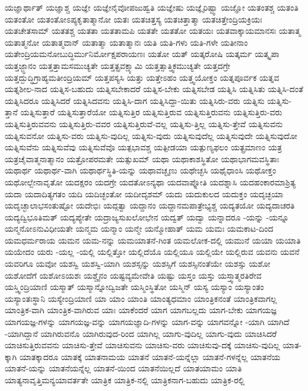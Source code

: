 {ಯಜ್ಞಾರ್ಥಾತ್
ಯಜ್ಞಾಶ್ಚ
ಯಜ್ಞೇ
ಯಜ್ಞೇನೈವೋಪಜುಹ್ವತಿ
ಯಜ್ಞೇಷು
ಯಜ್ಞೈರಿಷ್ಟ್ವಾ
ಯಜ್ಞೋ
ಯತಂತಶ್ಚ
ಯತಂತಿ
ಯತಂತೋ
ಯತಂತೋಽಪ್ಯಕೃತಾತ್ಮಾನೋ
ಯತಃ
ಯತಚಿತ್ತಸ್ಯ
ಯತಚಿತ್ತಾತ್ಮಾ
ಯತಚಿತ್ತೇಂದ್ರಿಯಕ್ರಿಯಃ
ಯತಚೇತಸಾಮ್
ಯತತಶ್ಚ
ಯತತಾ
ಯತತಾಮಪಿ
ಯತತೇ
ಯತತೋ
ಯತಯಃ
ಯತವಾಕ್ಕಾಯಮಾನಸಃ
ಯತಾತ್ಮ
ಯತಾತ್ಮನೋ
ಯತಾತ್ಮವಾನ್
ಯತಾತ್ಮಾ
ಯತಾತ್ಮಾನಃ
ಯತಿ
ಯತಿ-ಗಳು
ಯತಿ-ಗಳೇ
ಯತೀನಾಂ
ಯತೇಂದ್ರಿಯಮನೋಬುದ್ಧಿರ್ಮುನಿರ್ಮೋಕ್ಷಪರಾಯಣಃ
ಯತೋ
ಯತ್
ಯತ್ಕರೋಷಿ
ಯತ್ಕರ್ಮ
ಯತ್ಕೃಪಾ
ಯತ್ತಜ್ಜ್ಞಾನಂ
ಯತ್ತತ್ತಾಮಸಮುಚ್ಯತೇ
ಯತ್ತತ್ಪ್ರವಕ್ಷ್ಯಾಮಿ
ಯತ್ತತ್ಸಾತ್ತ್ವಿಕಮುಚ್ಯತೇ
ಯತ್ತದಗ್ರೇ
ಯತ್ತದ್ಬುದ್ಧಿಗ್ರಾಹ್ಯಮತೀಂದ್ರಿಯಮ್
ಯತ್ತಪಸ್ಯಸಿ
ಯತ್ತು
ಯತ್ತೇಽಹಂ
ಯತ್ತ್ವಯೋಕ್ತಂ
ಯತ್ನಪೂರ್ವಕ
ಯತ್ನವ
ಯತ್ನಶೀಲ-ನಾದ
ಯತ್ನಿಸ-ಬಹುದು
ಯತ್ನಿಸಬೇಕಾದರೆ
ಯತ್ನಿಸ-ಬೇಕು
ಯತ್ನಿಸಬೇಡ
ಯತ್ನಿಸಿ
ಯತ್ನಿಸಿತು
ಯತ್ನಿಸಿ-ದಂತೆ
ಯತ್ನಿಸಿದರೂ
ಯತ್ನಿಸಿದರೆ
ಯತ್ನಿಸಿದವನು
ಯತ್ನಿಸಿ-ದಾಗ
ಯತ್ನಿಸಿದ್ದಾ-ಯಿತು
ಯತ್ನಿಸಿರು-ವರು
ಯತ್ನಿಸು
ಯತ್ನಿಸು-ತ್ತಾನೆ
ಯತ್ನಿಸುತ್ತಾರೆ
ಯತ್ನಿಸುತ್ತಾರೆಯೋ
ಯತ್ನಿಸುತ್ತಿರ
ಯತ್ನಿಸುತ್ತಿರುವ
ಯತ್ನಿಸುತ್ತಿರುವನು
ಯತ್ನಿಸುತ್ತಿರು-ವರು
ಯತ್ನಿಸುತ್ತಿರುವವನು
ಯತ್ನಿಸುತ್ತಿರು-ವವರ
ಯತ್ನಿಸುತ್ತಿರುವೆ-ವಲ್ಲ
ಯತ್ನಿಸು-ತ್ತಿಲ್ಲ
ಯತ್ನಿಸು-ತ್ತೇವೆ
ಯತ್ನಿಸುವನು
ಯತ್ನಿಸುವನೋ
ಯತ್ನಿಸು-ವರು
ಯತ್ನಿಸು-ವುದಿಲ್ಲ
ಯತ್ನಿಸು-ವುದು
ಯತ್ನಿಸುವುದೆಲ್ಲ
ಯತ್ನಿಸುವುದೇ
ಯತ್ನಿಸುವುದೋ
ಯತ್ನಿಸುವೆನು
ಯತ್ನಿಸುವೆವು
ಯತ್ನಿಸುವೆವೊ
ಯತ್ಪಭಾವಶ್ಚ
ಯತ್ಪೀಡಯಾ
ಯತ್ಪುಣ್ಯಫಲಂ
ಯತ್ಪ್ರಮಾಣಂ
ಯತ್ರ
ಯತ್ರಚೈವಾತ್ಮನಾತ್ಮಾನಂ
ಯತ್ರೋಪರಮತೇ
ಯತ್ಸುಖಮ್
ಯಥಾ
ಯಥಾಕಾಶಸ್ಥಿತೋ
ಯಥಾಭಾಗಮವಸ್ಥಿತಾಃ
ಯಥಾರ್ಥ
ಯಥಾರ್ಥ-ವಾಗಿ
ಯಥಾರ್ಥಸ್ಥಿತಿ-ಯನ್ನು
ಯಥಾವಚ್ಛೃಣು
ಯಥೇಚ್ಛಸಿ
ಯಥೈಧಾಂಸಿ
ಯಥೋಕ್ತಂ
ಯಥೋಲ್ಬೇನಾವೃತೋ
ಯದಕ್ಷರಂ
ಯದಗ್ರೇ
ಯದತೋಽನ್ಯಥಾ
ಯದವಾಪ್ನೋತಿ
ಯದಶ್ನಾಸಿ
ಯದಹಂಕಾರಮಾಶ್ರಿತ್ಯ
ಯದಾ
ಯದಾದಿತ್ಯಗತಂ
ಯದಿ
ಯದಿಚ್ಛಂತೋ
ಯದೀದೃಶಮ್
ಯದು
ಯದುಕುಲದ
ಯದುಕ್ತಂ
ಯದೃಚ್ಛಯಾ
ಯದೃಚ್ಛಾಲಾಭಸಂತುಷ್ಟೋ
ಯದೇಭಿಃ
ಯದ್ಗತ್ವಾ
ಯದ್ದಾನಂ
ಯದ್ದಾನಮಪಾತ್ರೇಭ್ಯಶ್ಚ
ಯದ್ಯತಯೋ
ಯದ್ಯದಾಚರತಿ
ಯದ್ಯದ್ವಿಭೂತಿಮತ್
ಯದ್ಯಪ್ಯೇತೇ
ಯದ್ರಾಜ್ಯಸುಖಲೋಭೇನ
ಯದ್ವತ್
ಯದ್ವಾ
ಯನ್ನಾದರೂ
-ಯನ್ನು
-ಯನ್ನೂ
ಯನ್ಮನೋಽನುವಿಧೀಯತೇ
ಯನ್ಮಮ
ಯನ್ಮಾಂ
ಯನ್ಮೇ
ಯನ್ಮೋಹಾತ್
ಯಮ
ಯಮಃ
ಯಮಕಾಟ-ದಿಂದ
ಯಮಧರ್ಮರಾಯ
ಯಮನ
ಯಮ-ನನ್ನು
ಯಮಯಾತನೆ-ಗಿಂತ
ಯಮಲೋಕ-ದಲ್ಲಿ
ಯಮುನೆ
ಯಯಾ
ಯಯಾತಿ
ಯಯೇದಂ
ಯರು
-ಯಲ್ಲ
-ಯಲ್ಲಿ
ಯಲ್ಲಿತ್ತೋ
ಯಲ್ಲಿದೆಯೊ
ಯಲ್ಲಿಯೂ
ಯಲ್ಲಿಯೇ
ಯಲ್ಲಿರುವ
ಯವನು
ಯವನೆ
ಯವರಿಗೂ
ಯವೋ
ಯಶಸ್ವಿ
ಯಶಸ್ವಿ-ಯಾಗಿ
ಯಶಸ್ಸನ್ನು
ಯಶಸ್ಸಿಗೆ
ಯಶಸ್ಸಿನಂತೆಯೇ
ಯಶಸ್ಸು
ಯಶೋ
ಯಶೋದೆಗೆ
ಯಶೋಽಯಶಃ
ಯಶ್ಚೈನಂ
ಯಷ್ಟವ್ಯಮೇವೇತಿ
ಯಷ್ಟು
ಯಸ್ತಂ
ಯಸ್ತು
ಯಸ್ತ್ವಾತ್ಮರತಿರೇವ
ಯಸ್ತ್ವಿಂದ್ರಿಯಾಣಿ
ಯಸ್ಮಾತ್
ಯಸ್ಮಾನ್ನೋದ್ವಿಜತೇ
ಯಸ್ಮಿಂಸ್ಥಿತೋ
ಯಸ್ಮಿನ್
ಯಸ್ಯ
ಯಸ್ಯಾಂ
ಯಸ್ಯಾಂತಂ
ಯಸ್ಯಾಂತಃಸ್ಥಾನಿ
ಯಸ್ಯೇಂದ್ರಿಯಾಣಿ
ಯಾ
ಯಾಂ
ಯಾಂತಿ
ಯಾಂತ್ಯಧಮಾಂ
ಯಾಂತ್ರಿಕನಂತೆ
ಯಾಂತ್ರಿಕವಾಗಲ್ಲ
ಯಾಂತ್ರಿಕ-ವಾಗಿ
ಯಾಂತ್ರಿಕ-ವಾಗಿರುವ
ಯಾಃ
ಯಾಕೆಂದರೆ
ಯಾಗ
ಯಾಗಬಲ್ಲದು
ಯಾಗ-ಬೇಕು
ಯಾಗಯಜ್ಞ
ಯಾಗಯಜ್ಞ-ಗಳನ್ನು
ಯಾಗಯಜ್ಞ-ವನ್ನು
ಯಾಗಯಜ್ಞಾದಿ-ಗಳನ್ನು
ಯಾಗ-ವನ್ನು
ಯಾಗವನ್ನೋ
-ಯಾಗಿ
ಯಾಗಿದೆ
-ಯಾಗಿದ್ದಾನೆ
ಯಾಗಿರುವನೊ
ಯಾಗಿರುವುದ-ರಿಂದ
ಯಾಗಿಲ್ಲ
ಯಾಗು-ವುದಿಲ್ಲ
ಯಾಗು-ವುದು
ಯಾಚಿಸಿದರೆ
ಯಾಚಿಸುತ್ತಿರುವವನು
ಯಾಚಿಸು-ತ್ತೇವೆ
ಯಾಚಿಸುವನು
ಯಾಚಿಸು-ವರು
ಯಾಚಿಸುವು-ದಕ್ಕೆ
ಯಾಚಿಸು-ವುದಿಲ್ಲ
ಯಾತ-ಕ್ಕಾಗಿ
ಯಾತಕ್ಕಾದರೂ
ಯಾತಕ್ಕೆ
ಯಾತನಾಮಯ
ಯಾತನೆ
ಯಾತನೆ-ಯನ್ನೆಲ್ಲಾ
ಯಾತನೆ-ಗಳನ್ನೆಲ್ಲ
ಯಾತನೆಯ
ಯಾತನೆ-ಯನ್ನು
ಯಾತನೆಯನ್ನೆಲ್ಲ
ಯಾತನೆ-ಯಿಂದ
ಯಾತನೆಯಿಲ್ಲದೆ
ಯಾತಯಾಮಂ
ಯಾತಿ
ಯಾತ್ಯನಾವೃತ್ತಿಮನ್ಯಯಾವರ್ತತೇ
ಯಾತ್ರಿಕ
ಯಾತ್ರಿಕ-ನಲ್ಲಿ
ಯಾತ್ರಿಕನಾಗ-ಬಹುದು
ಯಾತ್ರಿಕ-ರಲ್ಲಿ
}
